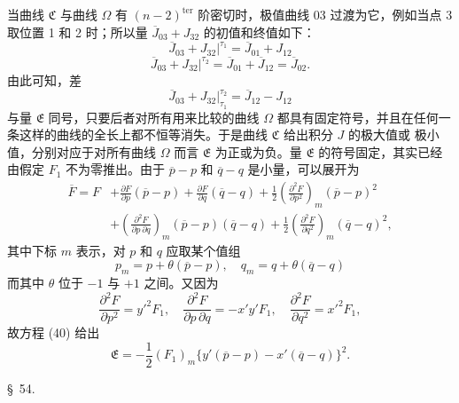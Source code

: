 \documentclass[11pt,a4paper,leqno]{article}
\begin{document}
当曲线 $\mathfrak{C}$ 与曲线 $\Omega$ 有 $(n-2)^{\mathrm{ter}}$ 阶密切时，极值曲线 03 过渡为它，例如当点 3 取位置 1 和 2 时；所以量 $\overline{J}_{03}+J_{32}$ 的初值和终值如下：
\[
\overline{J}_{03}+J_{32}\bigg|^{\tau_1}
=\overline{J}_{01}+J_{12}
\]
\[
\overline{J}_{03}+J_{32}\bigg|^{\tau_2}
=\overline{J}_{01}+\overline{J}_{12}=\overline{J}_{02}.
\]
由此可知，差
\[
\overline{J}_{03}+J_{32}\bigg|_{\tau_1}^{\tau_2}=\overline{J}_{12}-J_{12}
\]
与量 $\mathfrak{E}$ 同号，只要后者对所有用来比较的曲线 $\Omega$ 都具有固定符号，并且在任何一条这样的曲线的全长上都不恒等消失。于是曲线 $\mathfrak{C}$ 给出积分 $J$ 的极大值或
极小值，分别对应于对所有曲线 $\Omega$ 而言 $\mathfrak{E}$ 为正或为负。量 $\mathfrak{E}$ 的符号固定，其实已经由假定 $F_1$ 不为零推出。由于 $\overline{p}-p$ 和 $\overline{q}-q$ 是小量，可以展开为
\[
\begin{aligned}
\overline{F}=F&+\frac{\partial F}{\partial p}(\overline{p}-p)
+\frac{\partial F}{\partial q}(\overline{q}-q)
+\frac12\left(\frac{\partial^2F}{\partial p^2}\right)_m(\overline{p}-p)^2\\
&+\left(\frac{\partial^2F}{\partial p\,\partial q}\right)_m
(\overline{p}-p)(\overline{q}-q)
+\frac12\left(\frac{\partial^2F}{\partial q^2}\right)_m(\overline{q}-q)^2,
\end{aligned}
\]
其中下标 $m$ 表示，对 $p$ 和 $q$ 应取某个值组
\[
p_m=p+\theta(\overline{p}-p),\quad
q_m=q+\theta(\overline{q}-q)
\]
而其中 $\theta$ 位于 $-1$ 与 $+1$ 之间。又因为
\[
\frac{\partial^2F}{\partial p^2}=y'^2F_1,\quad
\frac{\partial^2F}{\partial p\,\partial q}=-x'y'F_1,\quad
\frac{\partial^2F}{\partial q^2}=x'^2F_1,
\]
故方程 (40) 给出
\[
\mathfrak{E}=-\frac12(F_1)_m\{y'(\overline{p}-p)-x'(\overline{q}-q)\}^2.
\]

\begin{center}
{\large \S~54.}
\end{center}
\end{document}
